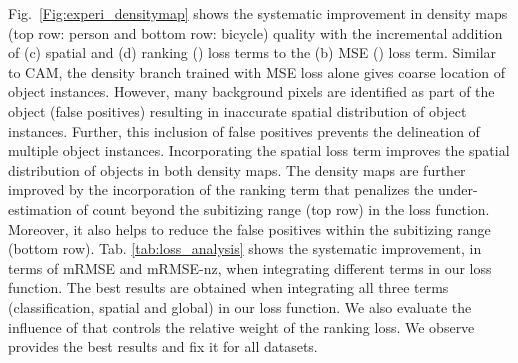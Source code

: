 \documentclass[10pt,twocolumn,letterpaper]{article}
\begin{document}
 Fig.~\ref{Fig:experi_densitymap} shows the systematic improvement in density maps (top row: person and bottom row: bicycle) quality with the incremental addition of (c) spatial   and (d) ranking () loss terms to the (b) MSE () loss term. Similar to CAM, the density branch trained with MSE loss alone gives coarse location of object instances. However, many background pixels are identified as part of the object (false positives) resulting in inaccurate spatial distribution of object instances. Further, this inclusion of false positives prevents the delineation of multiple object instances. Incorporating the spatial loss term improves the spatial distribution of objects in both density maps. The density maps are further improved by the incorporation of the ranking term that penalizes the under-estimation of count beyond the subitizing range (top row) in the loss function. Moreover, it also helps to reduce the false positives within the subitizing range (bottom row). Tab. \ref{tab:loss_analysis} shows the systematic improvement, in terms of mRMSE and mRMSE-nz, when integrating different terms in our loss function. The best results are obtained when integrating all three terms (classification, spatial and global) in our loss function. We also evaluate the influence of  that controls the relative weight of the ranking loss. We observe  provides the best results and fix it for all datasets. 
\end{document}
